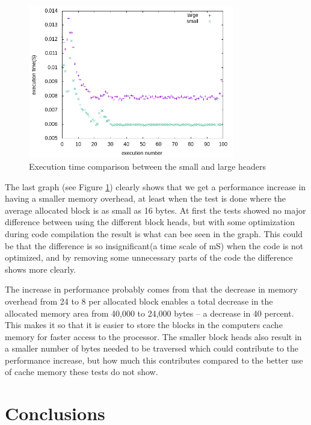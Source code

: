 \documentclass{article}
\begin{document}
    \begin{figure}[h!]
        \centering
        \includegraphics[width=0.8\textwidth]{time.png}
        \caption{Execution time comparison between the small and large headers}
        \label{fig:time}
    \end{figure}

The last graph (see Figure \ref{fig:time}) clearly shows that we get a performance increase in having a smaller memory overhead, at least when the
 test is done where the average allocated block is as small as 16 bytes. At first the tests showed no major difference between 
 using the different block heads, but with some optimization during code compilation the result is what can bee seen in
the graph. This could be that the difference is so insignificant(a time scale of mS) when the code is not optimized, and 
by removing some unnecessary parts of the code the difference shows more clearly. 

The increase in performance probably comes from that the decrease in memory overhead from 24 to 8 per allocated block enables 
a total decrease in the allocated memory area from 40,000 to 24,000 bytes – a decrease in 40 percent. This makes it so that 
it is easier to store the blocks in the computers cache memory for faster access to the processor. The smaller block heads also 
result in a smaller number of bytes needed to be traversed which could contribute 
to the performance increase, but how much this contributes compared to the better use of cache memory these tests do not show.

\newpage

\section{Conclusions}\label{conclusions}
\end{document}
